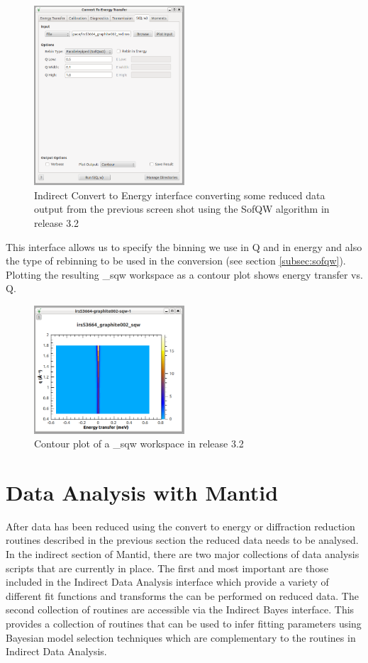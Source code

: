 \documentclass[paper=a4, fontsize=11pt]{scrartcl}	%
\numberwithin{equation}{section}															%
\numberwithin{figure}{section}																%
\numberwithin{table}{section}																%
\begin{document}
\begin{figure}[H]
\centering
\includegraphics[width=0.5\textwidth]{img/iris-c2e-sofqw.png}
\caption{Indirect Convert to Energy interface converting some reduced data output from the previous screen shot using the SofQW algorithm  in release 3.2}
\label{fig:iris-c2e-sofqw}
\end{figure}

This interface allows us to specify the binning we use in Q and in energy and also the type of rebinning to be used in the conversion (see section \ref{subsec:sofqw}). Plotting the resulting \*\_sqw workspace as a contour plot shows energy transfer vs. Q.

\begin{figure}[H]
\centering
\includegraphics[width=0.5\textwidth]{img/iris-c2e-sofqw-plot.png}
\caption{Contour plot of a \*\_sqw workspace in release 3.2}
\label{fig:iris-c2e-sofqw-plot}
\end{figure}

\section{Data Analysis with Mantid}

After data has been reduced using the convert to energy or diffraction reduction routines described in the previous section the reduced data needs to be analysed. In the indirect section of Mantid, there are two major collections of data analysis scripts that are currently in place. The first  and most important are those included in the Indirect Data Analysis interface which provide a variety of different fit functions and transforms the can be performed on reduced data. The second collection of routines are accessible via the Indirect Bayes interface. This provides a collection of routines that can be used to infer fitting parameters using Bayesian model selection techniques which are complementary to the routines in Indirect Data Analysis.
\end{document}
